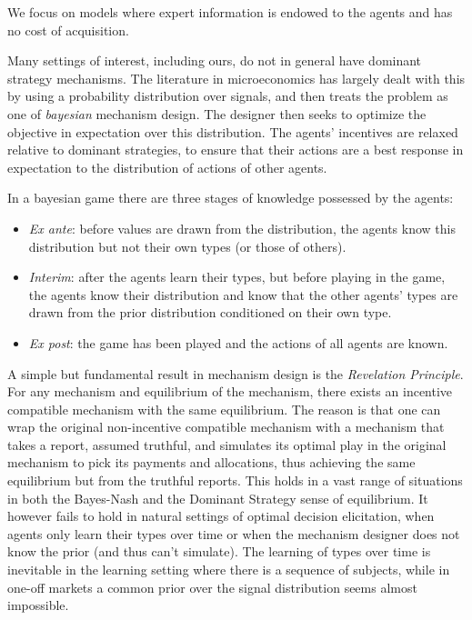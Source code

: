 We focus on models where expert information is endowed to the agents and has no cost of acquisition.

Many settings of interest, including ours, do not in general have dominant strategy mechanisms. 
The literature in microeconomics has largely dealt with this by using a probability distribution over signals, and then treats the problem as one of \emph{bayesian} mechanism design.
The designer then seeks to optimize the objective in expectation over this distribution. The agents' incentives are relaxed relative to dominant strategies, to ensure that their actions are a best response in expectation to the distribution of actions of other agents.

In a bayesian game there are three stages of knowledge possessed by the agents:
\begin{itemize}
   \item \emph{Ex ante}: before values are drawn from the distribution, the agents know this distribution but not their own types (or those of others).
   \item \emph{Interim}: after the agents learn their types, but before playing in the game, the agents know their distribution and know that the other agents' types are drawn from the prior distribution conditioned on their own type.
   \item \emph{Ex post}: the game has been played and the actions of all agents are known.
\end{itemize}

A simple but fundamental result in mechanism design is the \emph{Revelation Principle}.
For any mechanism and equilibrium of the mechanism, there exists an incentive compatible mechanism with the same equilibrium.
The reason is that one can wrap the original non-incentive compatible mechanism with a mechanism that takes a report, assumed truthful, and simulates its optimal play in the original mechanism to pick its payments and allocations, thus achieving the same equilibrium but from the truthful reports. 
This holds in a vast range of situations in both the Bayes-Nash and the Dominant Strategy sense of equilibrium. %
It however fails to hold in natural settings of optimal decision elicitation, when agents only learn their types over time or when the mechanism designer does not know the prior (and thus can't simulate).
The learning of types over time is inevitable in the learning setting where there is a sequence of subjects, while in one-off markets a common prior over the signal distribution seems almost impossible.





